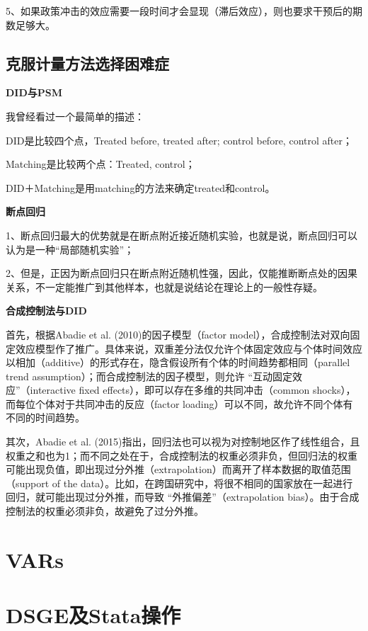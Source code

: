 \documentclass[cn,12pt,math=newtx,citestyle=gb7714-2015,bibstyle=gb7714-2015]{elegantbook}
\begin{document}
	5、如果政策冲击的效应需要一段时间才会显现（滞后效应），则也要求干预后的期数足够大。
	
	\section{克服计量方法选择困难症}
	\textbf{DID与PSM}
	
	我曾经看过一个最简单的描述：
	
	DID是比较四个点，Treated before, treated after; control before, control after；
	
	Matching是比较两个点：Treated, control；
	
	DID＋Matching是用matching的方法来确定treated和control。
	
	
	\textbf{断点回归}
	
	1、断点回归最大的优势就是在断点附近接近随机实验，也就是说，断点回归可以认为是一种“局部随机实验”；
	
	2、但是，正因为断点回归只在断点附近随机性强，因此，仅能推断断点处的因果关系，不一定能推广到其他样本，也就是说结论在理论上的一般性存疑。
	
	
	\textbf{合成控制法与DID}
	
	首先，根据Abadie et al. (2010)的因子模型（factor model），合成控制法对双向固定效应模型作了推广。具体来说，双重差分法仅允许个体固定效应与个体时间效应以相加（additive）的形式存在，隐含假设所有个体的时间趋势都相同（parallel trend assumption）；而合成控制法的因子模型，则允许 “互动固定效应”（interactive fixed effects），即可以存在多维的共同冲击（common shocks），而每位个体对于共同冲击的反应（factor loading）可以不同，故允许不同个体有不同的时间趋势。
	
	其次，Abadie et al. (2015)指出，回归法也可以视为对控制地区作了线性组合，且权重之和也为1；而不同之处在于，合成控制法的权重必须非负，但回归法的权重可能出现负值，即出现过分外推（extrapolation）而离开了样本数据的取值范围（support of the data）。比如，在跨国研究中，将很不相同的国家放在一起进行回归，就可能出现过分外推，而导致 “外推偏差”（extrapolation bias）。由于合成控制法的权重必须非负，故避免了过分外推。
	
	\chapter{VARs}
	
	
	\chapter{DSGE及Stata操作}
	
\end{document}
